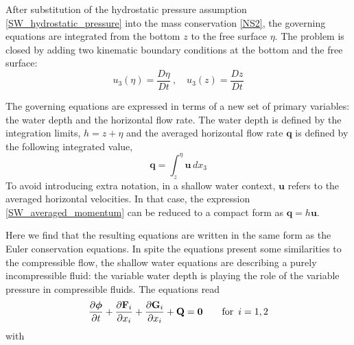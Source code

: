 After substitution of the hydrostatic pressure assumption \ref{SW_hydrostatic_pressure} into the mass conservation \ref{NS2}, the governing equations are integrated from the bottom $z$ to the free surface $\eta$. The problem is closed by adding two kinematic boundary conditions at the bottom and the free surface:
\begin{equation}
    u_3(\eta) = \frac{D\eta}{Dt} \ , \quad u_3(z) = \frac{Dz}{Dt}
\end{equation}


The governing equations are expressed in terms of a new set of primary variables: the water depth and the horizontal flow rate. The water depth is defined by the integration limits, $h = z + \eta$ and the averaged horizontal flow rate $\mathbf{q}$ is defined by the following integrated value,
\begin{equation} \label{SW_averaged_momentum}
    \mathbf{q} = \int_z^\eta \mathbf{u}\,dx_3
\end{equation}
To avoid introducing extra notation, in a shallow water context, $\mathbf{u}$ refers to the averaged horizontal velocities. In that case, the expression \ref{SW_averaged_momentum} can be reduced to a compact form as $\mathbf{q} = h\mathbf{u}$.


Here we find that the resulting equations are written in the same form as the Euler conservation equations. In spite the equations present some similarities to the compressible flow, the shallow water equations are describing a purely incompressible fluid: the variable water depth is playing the role of the variable pressure in compressible fluids. The equations read
\begin{equation} \label{general_sw}
\frac{\partial\bm{\phi}}{\partial t} + \frac{\partial\mathbf{F}_i}{\partial x_i} + \frac{\partial\mathbf{G}_i}{\partial x_i} + \mathbf{Q} = \mathbf{0} \qquad \text{for} \enspace i=1,2
\end{equation}
with


